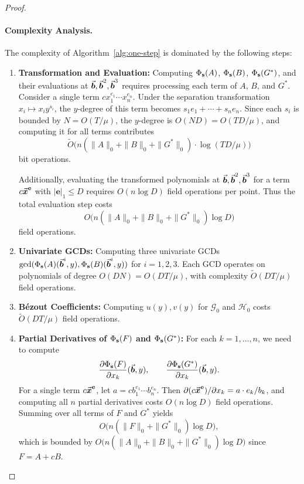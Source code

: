 \documentclass{article}
\numberwithin{equation}{section}
\begin{document}
\begin{proof}
\paragraph{Complexity Analysis.}
The complexity of Algorithm~\ref{alg:one-step} is dominated by the following steps:
\begin{enumerate}
    \item 
    \textbf{Transformation and Evaluation:} Computing $\Phi_{\mathbf{s}}(A)$, $\Phi_{\mathbf{s}}(B)$, $\Phi_{\mathbf{s}}(G^*)$, and their evaluations at $\vec{\boldsymbol{b}}, \vec{\boldsymbol{b}}^2, \vec{\boldsymbol{b}}^3$ requires processing each term of $A$, $B$, and $G^*$. Consider a single term $c x_1^{e_1}\cdots x_n^{e_n}$. Under the separation transformation $x_i \mapsto x_i y^{s_i}$, the $y$-degree of this term becomes $s_1 e_1 + \cdots + s_n e_n$. Since each $s_i$ is bounded by $N = O(T/\mu)$, the $y$-degree is $O(ND) = O(TD/\mu)$, and computing it for all terms contributes
\[
\widetilde O\bigl( n(\|A\|_0+\|B\|_0+\|G^*\|_0)\cdot\log (TD/\mu) \bigr)
\]
bit operations.

Additionally, evaluating the transformed polynomials at $\vec{\boldsymbol{b}}, \vec{\boldsymbol{b}}^2, \vec{\boldsymbol{b}}^3$ for a term $c \vec{\boldsymbol{x}}^{\mathbf{e}}$ with $|\mathbf{e}|_1 \le D$ requires $O(n \log D)$ field operations per point. Thus the total evaluation step costs
\[
O\bigl( n(\|A\|_0 + \|B\|_0 + \|G^*\|_0) \log D \bigr)
\]
field operations.

    
    \item \textbf{Univariate GCDs:} Computing three univariate GCDs $\gcd(\Phi_{\mathbf{s}}(A)(\vec{\boldsymbol{b}}^i,y), \Phi_{\mathbf{s}}(B)(\vec{\boldsymbol{b}}^i,y))$ for $i=1,2,3$. Each GCD operates on polynomials of degree $O(DN) = O(DT/\mu)$, with complexity $\widetilde{O}(DT/\mu)$ field operations. 
    
    \item \textbf{B\'ezout Coefficients:} Computing $u(y), v(y)$ for $\mathcal{G}_0$ and $\mathcal{H}_0$ costs $\widetilde{O}(DT/\mu)$ field operations.
    
    \item \textbf{Partial Derivatives of $\Phi_{\mathbf{s}}(F)$ and $\Phi_{\mathbf{s}}(G^*)$:} For each $k=1,\dots,n$, we need to compute
    \[
    \frac{\partial \Phi_{\mathbf{s}}(F)}{\partial x_k}(\vec{\boldsymbol{b}},y), \qquad \frac{\partial \Phi_{\mathbf{s}}(G^*)}{\partial x_k}(\vec{\boldsymbol{b}},y).
    \]
    For a single term $c \vec{\boldsymbol{x}}^{\mathbf{e}}$, let $a = c b_1^{e_1} \cdots b_n^{e_n}$. Then $\partial (c \vec{\boldsymbol{x}}^{\mathbf{e}})/\partial x_k = a \cdot e_k / b_k$, and computing all $n$ partial derivatives costs $O(n\log D)$ field operations. Summing over all terms of $F$ and $G^*$ yields
\[
O\bigl( n(\|F\|_0 + \|G^*\|_0) \log D \bigr),
\]
which is bounded by $O\bigl( n(\|A\|_0 + \|B\|_0 + \|G^*\|_0) \log D \bigr)$ since $F = A + cB$.
    

\end{enumerate}
\end{proof}
\end{document}
